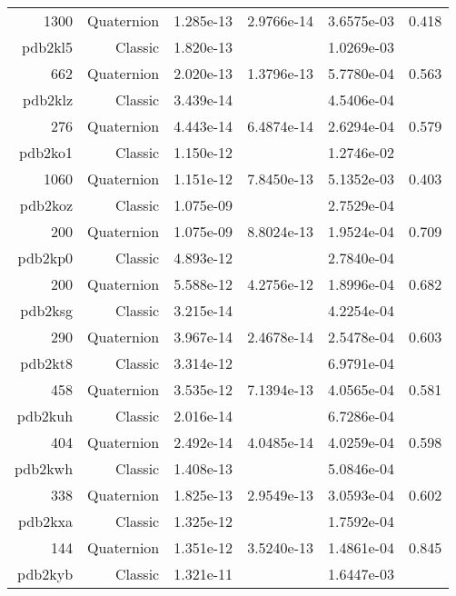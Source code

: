 \begin{xltabular}{\textwidth}{r|rS[table-format=1.3e+2]S[table-format=1.4e+2]S[table-format=1.4e+2]S[table-format=-1.3]}
1300 & Quaternion & 1.285e-13 & 2.9766e-14 & 3.6575e-03 & 0.418\\  \addlinespace
{\color{red} pdb2kl5 } & Classic & 1.820e-13 &  & 1.0269e-03 & \\
662 & Quaternion & 2.020e-13 & 1.3796e-13 & 5.7780e-04 & 0.563\\  \addlinespace
{\color{red} pdb2klz } & Classic & 3.439e-14 &  & 4.5406e-04 & \\
276 & Quaternion & 4.443e-14 & 6.4874e-14 & 2.6294e-04 & 0.579\\  \addlinespace
{\color{red} pdb2ko1 } & Classic & 1.150e-12 &  & 1.2746e-02 & \\
1060 & Quaternion & 1.151e-12 & 7.8450e-13 & 5.1352e-03 & 0.403\\  \addlinespace
{\color{red} pdb2koz } & Classic & 1.075e-09 &  & 2.7529e-04 & \\
200 & Quaternion & 1.075e-09 & 8.8024e-13 & 1.9524e-04 & 0.709\\  \addlinespace
{\color{red} pdb2kp0 } & Classic & 4.893e-12 &  & 2.7840e-04 & \\
200 & Quaternion & 5.588e-12 & 4.2756e-12 & 1.8996e-04 & 0.682\\  \addlinespace
{\color{red} pdb2ksg } & Classic & 3.215e-14 &  & 4.2254e-04 & \\
290 & Quaternion & 3.967e-14 & 2.4678e-14 & 2.5478e-04 & 0.603\\  \addlinespace
{\color{red} pdb2kt8 } & Classic & 3.314e-12 &  & 6.9791e-04 & \\
458 & Quaternion & 3.535e-12 & 7.1394e-13 & 4.0565e-04 & 0.581\\  \addlinespace
{\color{red} pdb2kuh } & Classic & 2.016e-14 &  & 6.7286e-04 & \\
404 & Quaternion & 2.492e-14 & 4.0485e-14 & 4.0259e-04 & 0.598\\  \addlinespace
{\color{red} pdb2kwh } & Classic & 1.408e-13 &  & 5.0846e-04 & \\
338 & Quaternion & 1.825e-13 & 2.9549e-13 & 3.0593e-04 & 0.602\\  \addlinespace
{\color{red} pdb2kxa } & Classic & 1.325e-12 &  & 1.7592e-04 & \\
144 & Quaternion & 1.351e-12 & 3.5240e-13 & 1.4861e-04 & 0.845\\  \addlinespace
{\color{red} pdb2kyb } & Classic & 1.321e-11 &  & 1.6447e-03 & \\

\end{xltabular}
